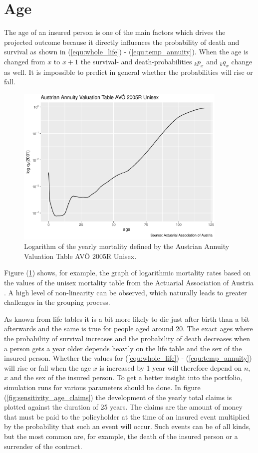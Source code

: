 \section{Age}
\label{sec:age} 
The age of an insured person is one of the main factors which drives the projected outcome because it directly influences the probability of death and survival as shown in (\ref{equ:whole_life}) - (\ref{equ:temp_annuity}). When the age is changed from $x$ to $x+1$ the survival- and death-probabilities ${}_{k}p_x$ and ${}_{k}q_x$ change as well. It is impossible to predict in general whether the probabilities will rise or fall.
\begin{figure}
	\centering
	\includegraphics[width=0.9\textwidth]{figures/chapter_sensitivities/Austrian_Annuity_Valuation_Table/avoe_2005R_unisex}
	\caption{Logarithm of the yearly mortality defined by the Austrian Annuity Valuation Table AVÖ 2005R Unisex.}
	\label{fig:sensitivity_annuity_table_graph}
\end{figure}
Figure (\ref{fig:sensitivity_annuity_table_graph}) shows, for example, the graph of logarithmic mortality rates based on the values of the unisex mortality table from the Actuarial Association of Austria \cite{kainhofer2006new}. A high level of non-linearity can be observed, which naturally leads to greater challenges in the grouping process.

As known from life tables it is a bit more likely to die just after birth than a bit afterwards and the same is true for people aged around 20.  The exact ages where the probability of survival increases and the probability of death decreases when a person gets a year older depends heavily on the life table and the sex of the insured person. Whether the values for (\ref{equ:whole_life}) - (\ref{equ:temp_annuity}) will rise or fall when the age $x$ is increased by 1 year will therefore depend on $n$, $x$ and the sex of the insured person. To get a better insight into the portfolio, simulation runs for various parameters should be done. 
In figure (\ref{fig:sensitivity_age_claims}) the development of the yearly total claims is plotted against the duration of 25 years. The claims are the amount of money that must be paid to the policyholder at the time of an insured event multiplied by the probability that such an event will occur. Such events can be of all kinds, but the most common are, for example, the death of the insured person or a surrender of the contract. 

